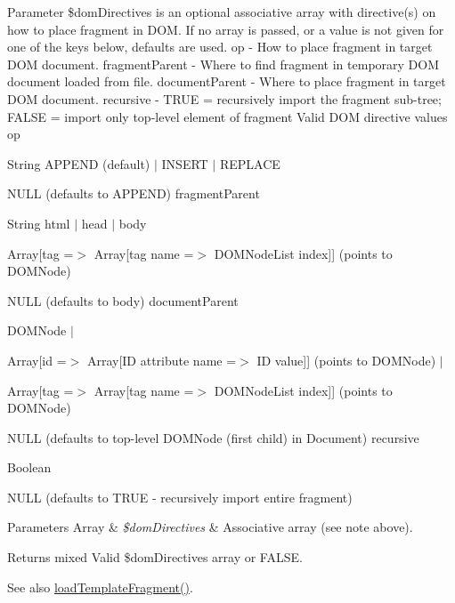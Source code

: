 Parameter \$dom\+Directives is an optional associative array with directive(s) on how to place fragment in D\+O\+M. If no array is passed, or a value is not given for one of the keys below, defaults are used. op -\/ How to place fragment in target D\+O\+M document. fragment\+Parent -\/ Where to find fragment in temporary D\+O\+M document loaded from file. document\+Parent -\/ Where to place fragment in target D\+O\+M document. recursive -\/ T\+R\+U\+E = recursively import the fragment sub-\/tree; F\+A\+L\+S\+E = import only top-\/level element of fragment Valid D\+O\+M directive values op
\begin{DoxyItemize}
\item String A\+P\+P\+E\+N\+D (default) $\vert$ I\+N\+S\+E\+R\+T $\vert$ R\+E\+P\+L\+A\+C\+E
\item N\+U\+L\+L (defaults to A\+P\+P\+E\+N\+D) fragment\+Parent
\item String html $\vert$ head $\vert$ body
\item Array\mbox{[}\textquotesingle{}tag\textquotesingle{} =$>$ Array\mbox{[}tag name =$>$ D\+O\+M\+Node\+List index\mbox{]}\mbox{]} (points to D\+O\+M\+Node)
\item N\+U\+L\+L (defaults to \textquotesingle{}body\textquotesingle{}) document\+Parent
\item D\+O\+M\+Node $\vert$
\item Array\mbox{[}\textquotesingle{}id\textquotesingle{} =$>$ Array\mbox{[}I\+D attribute name =$>$ I\+D value\mbox{]}\mbox{]} (points to D\+O\+M\+Node) $\vert$
\item Array\mbox{[}\textquotesingle{}tag\textquotesingle{} =$>$ Array\mbox{[}tag name =$>$ D\+O\+M\+Node\+List index\mbox{]}\mbox{]} (points to D\+O\+M\+Node)
\item N\+U\+L\+L (defaults to top-\/level D\+O\+M\+Node (first child) in Document) recursive
\item Boolean
\item N\+U\+L\+L (defaults to T\+R\+U\+E -\/ recursively import entire fragment)
\end{DoxyItemize}


\begin{DoxyParams}[1]{Parameters}
Array & {\em \$dom\+Directives} & Associative array (see note above).\\
\hline
\end{DoxyParams}
\begin{DoxyReturn}{Returns}
mixed Valid \$dom\+Directives array or F\+A\+L\+S\+E. 
\end{DoxyReturn}
\begin{DoxySeeAlso}{See also}
\hyperlink{class_able_polecat___dom_af8f857ffafb0c1e59d752b7b430a95a0}{load\+Template\+Fragment()}. 
\end{DoxySeeAlso}


